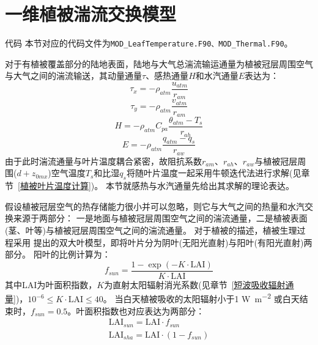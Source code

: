 \section{一维植被湍流交换模型}\label{一维植被湍流交换模型}
\begin{mymdframed}{代码}
本节对应的代码文件为\texttt{MOD\_LeafTemperature.F90、MOD\_Thermal.F90}。
\end{mymdframed}

对于有植被覆盖部分的陆地表面，陆地与大气总湍流输运通量为植被冠层周围空气与大气之间的湍流输送，其动量通量$\tau$、感热通量$H$和水汽通量$E$表达为：
\begin{equation}
\tau_{x}=-\rho_{atm} \frac{u_{atm}}{r_{a m}}
\end{equation}
\begin{equation}
\tau_{y}=-\rho_{atm} \frac{v_{atm}}{r_{a m}}
\end{equation}
\begin{equation}
H=-\rho_{atm} C_{p a} \frac{\theta_{atm}-T_{s}}{r_{a h}}
\end{equation}
\begin{equation}
E=-\rho_{atm} \frac{q_{atm}-q_{s}}{r_{a w}}
\end{equation}
由于此时湍流通量与叶片温度耦合紧密，故阻抗系数$r_{am}$、$r_{ah}$、$r_{aw}$与植被冠层周围($d+z_{0mx}$)空气温度$T_s$和比湿$q_s$将随叶片温度一起采用牛顿迭代法进行求解(见章节~\ref{植被叶片温度计算})。
本节就感热与水汽通量先给出其求解的理论表达。


假设植被冠层空气的热存储能力很小并可以忽略，则它与大气之间的热量和水汽交换来源于两部分：
一是地面与植被冠层周围空气之间的湍流通量，二是植被表面(茎、叶等)与植被冠层周围空气之间的湍流通量。
对于植被的描述，植被生理过程采用 \citet{dai2004two}提出的双大叶模型，即将叶片分为阴叶(无阳光直射)与阳叶(有阳光直射)两部分。
阳叶的比例计算为：
\begin{equation}
f_{sun}=\frac{1-\exp (-K \cdot \text {LAI})}{K \cdot \text {LAI}}
\end{equation}
其中LAI为叶面积指数，$K$为直射太阳辐射消光系数(见章节~\ref{短波吸收辐射通量})，${10}^{-6}\leqslant K \cdot \text {LAI}\le40$。
当白天植被吸收的太阳辐射小于1 \unit{W.m^{-2}} 或白天结束时，$f_{sun}=0.5$。叶面积指数也对应表达为两部分：
\begin{equation}
\begin{array}{c} \text {LAI}_{sun}= \text {LAI} \cdot f_{sun} \\ \text {LAI}_{sha}=\text {LAI} \cdot \left(1-f_{sun}\right)\end{array}
\end{equation}

